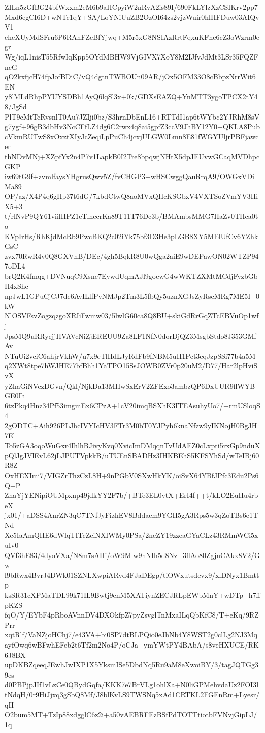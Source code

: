 ZILn5zGfBG24bfWxxm2eM6b9aHCpyiW2nRvA2is89I/690FkLYlzXzCSIKrv2pp7
Mxd6egCI6D+wNTc1qY+SA/LoYNiUuZB2OzOI64zs2vjzWuir0hlHFDuw03AIQvV1
eheXUyMdSFru6P6RAhFZeBfYjwq+M5r5xG8NSIAzRrtFqxuKFhe6cZ3oWzrm0egr
Wg/iqL1nisT55RfwIqKpp5OYdMBHW9VjGIVX7XoY8M2IJfvJdMt3LSr35FQZFncG
qO2kxfjcH74fpJofBDiC/vQ4dgtnTWBOUn09AR/jOx5OFM33O8cBbpzNrrWit6EN
y8lMLdRhpPYUYSDBh1AyQ6lqSl3x+0k/GDXsEAZQ+YnMTT3ygoTPCX2tY48/JgSd
PlT9cMtTcRvsnlT0Au7JZIji0bz/S3hrnDbEnL16+RTTdI1ap6tWYbc2YJRhM8sV
g7ygf+96gB3dbHv3NcCFfLZ4dg6C2rwx4q8ai5gpfZ3ccV9JhBY12Y0+QKLA8Pub
cVkmRUTwS8xOxztXIyJcZeqiLpPuCh4jcxjULGW0Lmn8E81fWGYUljrPBFjawcer
thNDvMNj+XZpfYx2n4P7v1LapkB0I2Tre8bpqwjNHtX5dpJEUvwGCaqMVDhpcGKP
iw69tG9f+zvmlfaysYHgrusQwv5Z/fvCHGP3+wHSCwggQauRrqA9/OWGxVDiMa89
OP/az/X4P4q6gIIp37t6dG/7kbdCtwQ8aoMVxQHcKSGbxV4VXTSoZVmYV3HiX5+3
t/rlNvP9QY61viilHPZ1eTlnccrKa89T11T76Dc3b/BMAmbsMMG7HaZv0THca0to
KVpIrHs/RhKjdMcRb9PwcBKQ2c02iYk75bf3D3He3pLGB8XY5MElUfCv6YZhkGsC
zvx70RwR4v0Q8GXVhB/DEc/4gh5BqkR8U0wQga2aiE9wDEPawON02WTZP947oDL4
brQ2K4fmqg+DVNuqC9Xsne7EywdUqmAJl9goewG4wWKTZXMtMCdjFyzbGbH4xShc
npJwL1GPuCjCJ7de6AvILlfPvNMJp2Tm3L5fbQy5uznXGJsZyRscMRg7ME5I+0kW
NlOSVFsvZogzqzgoXRIiFwmw03/5lwlG60ca8Q8BU+skiGdRrGqZTcEBVuOp1wfj
JpsMQ9uRRycjjHVAVcNiZjEREUU9Za8LF1NfN0dorDjQZ3MsgbStdo8J353GMfAv
NTuUi2vciC6ahjrVkhW/u7x9eTlHdLJyRdFb9fNBM5uH1Pct3cqJzpSSi77b4a5M
q2XWt8tpe7hWJHE77bfBhh1YaTPO15SsJOWB0ZVr0p20uM2/D77/Har2lpHviSvX
yZhaGiNVezDGvn/Qkl/NjkDa13MHwSxErV2ZFExo3ambzQP6DxUUR9flWYBGE0Ih
6tzPkq4Hnz34Pf53imgmEx6CPzA+1cV20imqBSXhK3ITEAsuhyUo7/+rmUSloqS4
2gODTC+Aih926PLJhcIVYIcHV3FTr3M0bT0YJPyh6knaNfzw9yIKNojH0BgJH7El
To5zGA3oqoWuGxr4IhlhBJivyKvq0XvicImDMqqnTvUdAEZ0cLxpti5rxGp9nduX
pQlJgJVlEvL62jLJPUTVpkkB/uTUEnSBADHz3IHKBEhS5KFSYhSd/wTeIBj60R8Z
OxHEXImi7/VIGZrThzCzL8H+9nPGbV0SXwHkYK/oiSvX64YBfJPfc3Edu2Ps6Q+P
ZhaYjYENipiOUMpxnp49jdkYY2F7b/+BTe3EL0vtX+ErI4f++t/kLO2EuHu4rbeX
jx01/+aDSS4AnrZN3qC7TNfJyFizhEV8Bddaem9YGH5gA3Rps5w3qZoTBs6e1TNd
Xe5IaAmQHE6dWlqTITcZciNXIWMy0PSa/2neZY19zzeaGYaCLz43RMmWCi5xuIv0
QVf3hE83/4dyoVXa/N8m7sAHi/oW9Mlw9hNIh5d8Nz+3flAo80ZgjnCAkx8V2/Gw
l9bRwx4BvrJ4DWk01SZNLXwpiARvd4FJaDEgp/tiOWxutsdevx9/xlDNyx1Bmttp
ksSR31cXPMaTDL99k71IL9Bwtj9enM5XATiynZECJRLpEWbMnY+wDTp+h7ffpKZS
fqO/Y/EYbF4pRboAVnnDV4DXOkfpZ7pyZsvglTnMxaILqQbKfC8/T+eKq/9RZPrr
xqtRlf/VaNZjoHChj7/e43VA+bi0SP7dtBLPQio0eJhNb4Y8WST2g0clLg2NJ3Mq
ayfOwq6wBFwhEFeb2t6Tf2m2No4P/oCJa+ymYWtPY4BAbA/s8veHXUCE/RK6J8BX
upDKBZqeeqJEwhJwIXP1X5YksmISe5DbdNq5Ru9aM8eXwoiBY/3/tagJQTGg39cs
d0PBPjpJIf1vLzCe0QBydGqfa/KKK7e7BrVLg1ohlXa+N0liGPMehvdaUz2FOI3l
tNdqH/0r9HiJjxq3gSbQ8Mf/J8blKvLS9TWSNq5xAd1CRTKL2FGEnRm+Lyesr/qH
O2bum5MT+TzIp88xdgglC6z2i+a50vAEBRFEzBSfPdTOTTtiotbFVNvjGipLJ/1q
